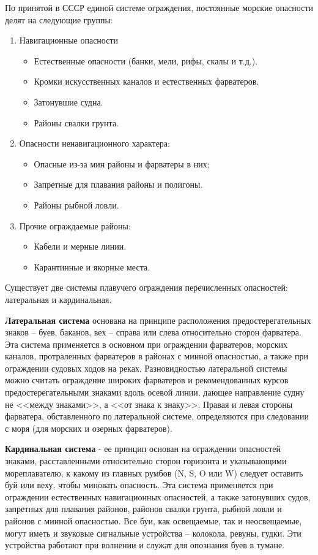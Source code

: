 \documentclass[a4paper, 12pt, twoside, final, book, russian, fittopage, cyremdash]{ncc}
\begin{document}
По принятой в СССР единой системе ограждения, постоянные морские опасности делят на следующие группы:
\begin{enumerate}
\item Навигационные опасности 
  \begin{itemize}
  \item Естественные опасности (банки, мели, рифы, скалы и т.д.). 
  \item Кромки искусственных каналов и естественных фарватеров. 
  \item Затонувшие судна. 
  \item Районы свалки грунта. 
  \end{itemize}
\item Опасности ненавигационного характера: 
  \begin{itemize}
  \item Опасные из-за мин районы и фарватеры в них; 
  \item Запретные для плавания районы и полигоны. 
  \item Районы рыбной ловли. 
  \end{itemize}
\item Прочие ограждаемые районы: 
  \begin{itemize}
  \item Кабели и мерные линии. 
  \item Карантинные и якорные места. 
  \end{itemize}
\end{enumerate}

Существует две системы плавучего ограждения перечисленных опасностей: латеральная и кардинальная.

\textbf{Латеральная система} основана на принципе расположения предостерегательных знаков \--- буев, баканов, вех \--- справа или слева относительно сторон фарватера. Эта система применяется в основном при ограждении фарватеров, морских каналов, протраленных фарватеров в районах с минной опасностью, а также при ограждении судовых ходов на реках. Разновидностью латеральной системы можно считать ограждение широких фарватеров и рекомендованных курсов предостерегательными знаками вдоль осевой линии, дающее направление судну не <<между знаками>>, а <<от знака к знаку>>. Правая и левая стороны фарватера, обставленного по латеральной системе, определяются при следовании с моря (для морских и озерных фарватеров).

\textbf{Кардинальная система} \-- ее принцип основан на ограждении опасностей знаками, расставленными относительно сторон горизонта и указывающими мореплавателю, к какому из главных румбов (N, S, O или W) следует оставить буй или веху, чтобы миновать опасность. Эта система применяется при ограждении естественных навигационных опасностей, а также затонувших судов, запретных для плавания районов, районов свалки грунта, рыбной ловли и районов с минной опасностью. Все буи, как освещаемые, так и неосвещаемые, могут иметь и звуковые сигнальные устройства \--- колокола, ревуны, гудки. Эти устройства работают при волнении и служат для опознания буев в тумане. 
\end{document}

